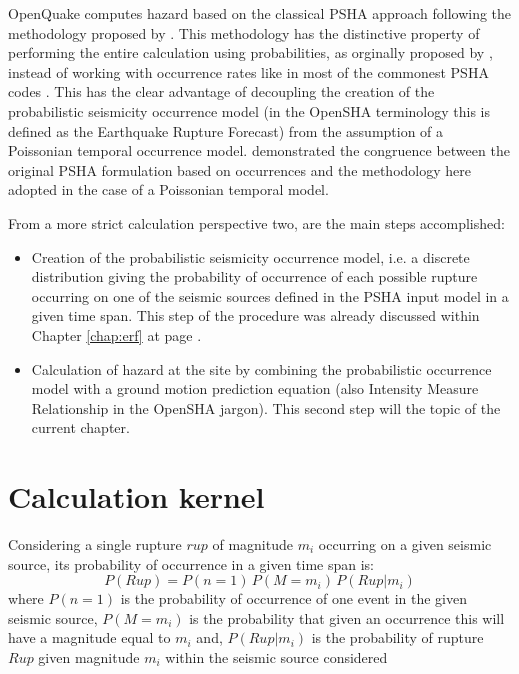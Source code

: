 OpenQuake computes hazard based on the classical PSHA approach 
\citep{cornell1968,mcguire2004} following the methodology proposed by 
\citet{field2003}. This methodology has the distinctive property of performing
the entire calculation using probabilities, as orginally proposed by 
\citet{chiang1984}, instead of working with occurrence rates like in most 
of the commonest PSHA codes \citep[see for instance][]{bender1987}. 
%
This has the clear advantage of decoupling the creation of the probabilistic 
seismicity occurrence model (in the OpenSHA terminology this is defined as the 
Earthquake Rupture Forecast) from the assumption of a Poissonian temporal 
occurrence model. 
%
\citet{field2003} demonstrated the congruence between the original PSHA 
formulation based on occurrences and the methodology here adopted 
in the case of a Poissonian temporal model. 

From a more strict calculation perspective two, are the main steps accomplished:
\begin{itemize}
\item Creation of the probabilistic seismicity occurrence model, i.e. a discrete 
distribution giving the probability of occurrence of each possible rupture 
occurring on one of the seismic sources defined in the PSHA input model in a  
given time span. This step of the procedure was already discussed within 
Chapter \ref{chap:erf} at page \pageref{chap:erf}.
\item Calculation of hazard at the site by combining the probabilistic 
occurrence model with a ground motion prediction equation (also Intensity 
Measure Relationship in the OpenSHA jargon). This second step will the topic 
of the current chapter.
\end{itemize}
%
\section{Calculation kernel}
Considering a single rupture $rup$ of magnitude $m_i$ occurring on a given 
seismic source, its probability of occurrence in a given time span is: 
\begin{equation}
P(Rup) = P(n=1)\,P(M=m_i)\,P(Rup|m_i)
\end{equation}
where $P(n=1)$ is the probability of occurrence of one event in the given seismic
source, $P(M=m_i)$ is the probability that given an occurrence this will have a 
magnitude equal to $m_i$ and, $P(Rup|m_i)$ is the probability of rupture $Rup$
given magnitude $m_i$ within the seismic source considered 
%
